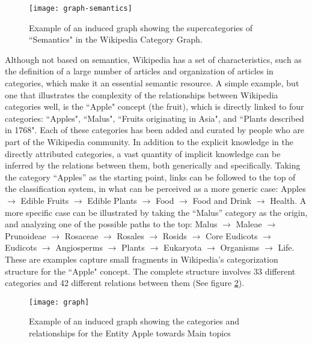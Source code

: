 \begin{figure}[H]
\centering
  \texttt{[image: graph-semantics]}
  \caption{Example of an induced graph showing the supercategories of ``Semantics" in the Wikipedia Category Graph.}
  \label{fig:semantics-category}
\end{figure}

Although not based on semantics, Wikipedia has a set of characteristics, such as the definition of a large number of articles and organization of articles in categories, which make it an essential semantic resource. A simple example, but one that illustrates the complexity of the relationships between Wikipedia categories well, is the ``Apple" concept (the fruit), which is directly linked to four categories: ``Apples", ``Malus", ``Fruits originating in Asia", and ``Plants described in 1768". Each of these categories has been added and curated by people who are part of the Wikipedia community. In addition to the explicit knowledge in the directly attributed categories, a vast quantity of implicit knowledge can be inferred by the relations between them, both generically and specifically. Taking the category ``Apples'' as the starting point, links can be followed to the top of the classification system, in what can be perceived as a more generic case: Apples $\rightarrow$  Edible Fruits $\rightarrow$ Edible Plants $\rightarrow$ Food $\rightarrow$ Food and Drink $\rightarrow$ Health.
A more specific case can be illustrated by taking the ``Malus'' category as the origin, and analyzing one of the possible paths to the top: Malus $\rightarrow$ Maleae $\rightarrow$ Prunoideae $\rightarrow$ Rosaceae $\rightarrow$ Rosales $\rightarrow$ Rosids $\rightarrow$ Core Eudicots $\rightarrow$ Eudicots $\rightarrow$ Angiosperms $\rightarrow$ Plants $\rightarrow$ Eukaryota $\rightarrow$ Organisms $\rightarrow$ Life.
These are examples capture small fragments in Wikipedia's categorization structure for the ``Apple" concept. The complete structure involves 33 different categories and 42 different relations between them (See figure \ref{fig:semantics-category-apple}).


\begin{figure}[H]
\centering
  \texttt{[image: graph]}
  \caption{Example of an induced graph showing the categories and relationships for the Entity Apple towards Main topics}
  \label{fig:semantics-category-apple}
\end{figure}



